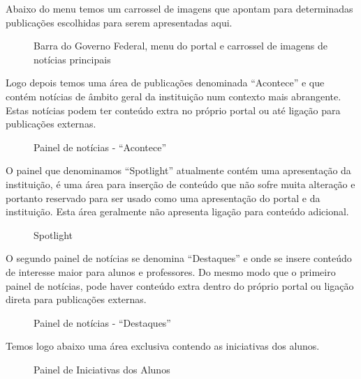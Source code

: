 Abaixo do menu temos um carrossel de imagens que apontam para determinadas publicações escolhidas para serem apresentadas aqui.

\begin{figure}[!ht]
    \centering
    \caption{Barra do Governo Federal, menu do portal e carrossel de imagens de notícias principais}\label{RS0006:fig:panel-001}
\end{figure}

Logo depois temos uma área de publicações denominada ``Acontece'' e que contém notícias de âmbito geral da instituição num contexto mais abrangente. Estas notícias podem ter conteúdo extra no próprio portal ou até ligação para publicações externas.

\begin{figure}[!ht]
    \centering
    \caption{Painel de notícias - ``Acontece''}\label{RS0006:fig:panel-002}
\end{figure}

O painel que denominamos ``Spotlight'' atualmente contém uma apresentação da instituição, é uma área para inserção de conteúdo que não sofre muita alteração e portanto reservado para ser usado como uma apresentação do portal e da instituição. Esta área geralmente não apresenta ligação para conteúdo adicional.

\begin{figure}[!ht]
    \centering
    \caption{Spotlight}\label{RS0006:fig:panel-003}
\end{figure}

O segundo painel de notícias se denomina ``Destaques'' e onde se insere conteúdo de interesse maior para alunos e professores. Do mesmo modo que o primeiro painel de notícias, pode haver conteúdo extra dentro do próprio portal ou ligação direta para publicações externas.

\begin{figure}[!ht]
    \centering
    \caption{Painel de notícias - ``Destaques''}\label{RS0006:fig:panel-004}
\end{figure}

Temos logo abaixo uma área exclusiva contendo as iniciativas dos alunos.

\begin{figure}[!ht]
    \centering
    \caption{Painel de Iniciativas dos Alunos}\label{RS0006:fig:panel-005}
\end{figure}

